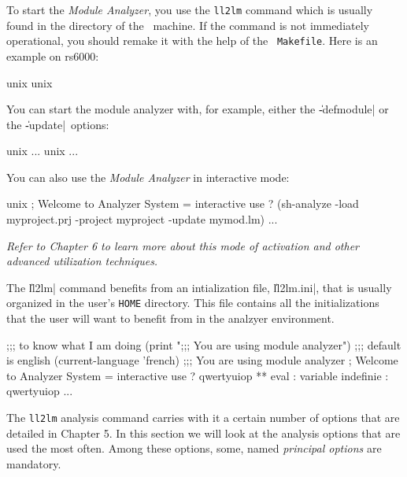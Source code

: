 
To start the {\em Module Analyzer}, you use the {\tt ll2lm} command which is usually found in the directory of the \LeLisp\  machine.  If the command is not immediately operational, you should remake it with the help of the \LeLisp\  {\tt Makefile}.  Here is an example on rs6000:
\begin{Longcode*}
unix%
unix%
\end{Longcode*}
You can start the module analyzer with, for example, either the \|-defmodule| or the \|-update|\ options: 
\begin{Longcode*}
unix%
 ...
unix%
 ...
\end{Longcode*}

You can also use the {\em Module Analyzer} in interactive mode:

\begin{Longcode*}
unix%
; Welcome to Analyzer System
= interactive use
? (sh-analyze -load myproject.prj -project myproject -update mymod.lm)
 ...
\end{Longcode*}

{\it Refer to Chapter 6 to learn more about this mode of activation and other advanced utilization techniques.}

The \|ll2lm| command benefits from an intialization file, \|ll2lm.ini|, that is usually organized in the user's {\tt HOME} directory.
This file contains all the initializations that the user will want to benefit from in the analzyer environment.
\begin{Longcode*}
;;; to know what I am doing
(print ";;; You are using module analyzer")
;;; default is english
(current-language 'french)
;;; You are using module analyzer
; Welcome to Analyzer System
= interactive use
? qwertyuiop
** eval : variable indefinie : qwertyuiop
 ...
\end{Longcode*}

The {\tt ll2lm} analysis command carries with it a certain number of options that are detailed in Chapter 5.  In this section we will look at the analysis options that are used the most often.
Among these options, some, named {\it principal options} are mandatory.

